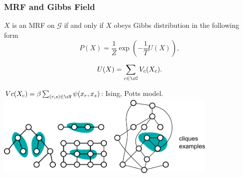 \documentclass[sansserif, 10pt]{beamer}
\begin{document}
\begin{frame}
\frametitle{MRF and Gibbs Field}

\begin{theorem}
  $X$ is an MRF on $\mathcal{G}$ if and only if $X$ obeys Gibbs distribution in
  the following form
  \begin{equation*}
    P(X) = \frac{1}{Z}\exp \left( -\frac{1}{T} U(X) \right),
  \end{equation*}

  \begin{equation*}
    U(X) = \sum_{c\in \cC} V_c(X_c).
  \end{equation*}
\end{theorem}

$Vc(X_c) = \beta \sum_{(r,s) \in \cV} \psi(x_r, x_s) $: Ising, Potts model.
\centering
\includegraphics[width = 0.8\textwidth]{sfig/clique_examples}

\end{frame}
\end{document}
